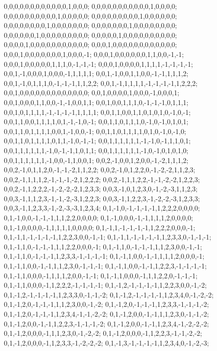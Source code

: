 {{0,0,0,0,0,0,0,0,0,0,0,0,1,0,0,0; 0,0,0,0,0,0,0,0,0,0,0,1,0,0,0,0; 0,0,0,0,0,0,0,0,0,0,1,0,0,0,0,0; 0,0,0,0,0,0,0,0,0,1,0,0,0,0,0,0; 0,0,0,0,0,0,0,0,1,0,0,0,0,0,0,0; 0,0,0,0,0,0,0,1,0,0,0,0,0,0,0,0; 0,0,0,0,0,0,1,0,0,0,0,0,0,0,0,0; 0,0,0,0,0,1,0,0,0,0,0,0,0,0,0,0; 0,0,0,0,1,0,0,0,0,0,0,0,0,0,0,0; 0,0,0,1,0,0,0,0,0,0,0,0,0,0,0,0; 0,0,0,1,0,0,0,0,0,0,0,1,0,0,0,-1; 0,0,0,1,0,0,0,0,0,0,1,1,0,0,-1,-1;
0,0,0,1,0,0,0,0,0,1,1,1,0,-1,-1,-1; 0,0,0,1,0,0,0,0,1,1,1,1,-1,-1,-1,-1; 0,0,1,-1,0,0,0,1,0,0,0,-1,1,1,1,1; 0,0,1,-1,0,0,1,1,0,0,-1,-1,1,1,1,2; 0,0,1,-1,0,1,1,1,0,-1,-1,-1,1,1,2,2; 0,0,1,-1,1,1,1,1,-1,-1,-1,-1,1,2,2,2; 0,0,1,0,0,0,0,0,0,0,0,0,0,0,0,0; 0,0,1,0,0,0,0,1,0,0,0,-1,0,0,0,1; 0,0,1,0,0,0,1,1,0,0,-1,-1,0,0,1,1; 0,0,1,0,0,1,1,1,0,-1,-1,-1,0,1,1,1; 0,0,1,0,1,1,1,1,-1,-1,-1,-1,1,1,1,1; 0,0,1,1,0,0,1,1,0,1,0,1,0,-1,0,-1;
0,0,1,1,0,0,1,1,1,1,0,1,-1,-1,0,-1; 0,0,1,1,0,1,1,1,0,-1,0,-1,0,1,0,1; 0,0,1,1,0,1,1,1,1,0,0,1,-1,0,0,-1; 0,0,1,1,0,1,1,1,1,0,1,0,-1,0,-1,0; 0,0,1,1,0,1,1,1,1,0,1,1,-1,0,-1,-1; 0,0,1,1,1,1,1,1,-1,-1,0,-1,1,1,0,1; 0,0,1,1,1,1,1,1,-1,0,-1,-1,1,0,1,1; 0,0,1,1,1,1,1,1,-1,0,-1,0,1,0,1,0; 0,0,1,1,1,1,1,1,-1,0,0,-1,1,0,0,1; 0,0,2,-1,0,0,1,2,0,0,-1,-2,1,1,1,2; 0,0,2,-1,0,1,1,2,0,-1,-1,-2,1,1,2,2; 0,0,2,-1,0,1,2,2,0,-1,-2,-2,1,1,2,3;
0,0,2,-1,1,1,1,2,-1,-1,-1,-2,1,2,2,2; 0,0,2,-1,1,1,2,2,-1,-1,-2,-2,1,2,2,3; 0,0,2,-1,1,2,2,2,-1,-2,-2,-2,1,2,3,3; 0,0,3,-1,0,1,2,3,0,-1,-2,-3,1,1,2,3; 0,0,3,-1,1,1,2,3,-1,-1,-2,-3,1,2,2,3; 0,0,3,-1,1,2,2,3,-1,-2,-2,-3,1,2,3,3; 0,0,3,-1,1,2,3,3,-1,-2,-3,-3,1,2,3,4; 0,1,-1,0,-1,-1,-1,-1,1,2,2,2,0,0,0,0; 0,1,-1,0,0,-1,-1,-1,1,1,2,2,0,0,0,0; 0,1,-1,0,0,0,-1,-1,1,1,1,2,0,0,0,0; 0,1,-1,0,0,0,0,-1,1,1,1,1,0,0,0,0; 0,1,-1,1,-1,-1,-1,-1,1,2,2,2,0,0,0,-1;
0,1,-1,1,-1,-1,-1,-1,1,2,2,3,0,0,-1,-1; 0,1,-1,1,-1,-1,-1,-1,1,2,3,3,0,-1,-1,-1; 0,1,-1,1,0,-1,-1,-1,1,1,2,2,0,0,0,-1; 0,1,-1,1,0,-1,-1,-1,1,1,2,3,0,0,-1,-1; 0,1,-1,1,0,-1,-1,-1,1,2,3,3,-1,-1,-1,-1; 0,1,-1,1,0,0,-1,-1,1,1,1,2,0,0,0,-1; 0,1,-1,1,0,0,-1,-1,1,1,2,3,0,-1,-1,-1; 0,1,-1,1,0,0,-1,-1,1,2,2,3,-1,-1,-1,-1; 0,1,-1,1,0,0,0,-1,1,1,1,2,0,0,-1,-1; 0,1,-1,1,0,0,0,-1,1,1,2,2,0,-1,-1,-1; 0,1,-1,1,0,0,0,-1,1,2,2,2,-1,-1,-1,-1; 0,1,-1,2,-1,-1,-1,-1,1,2,2,3,0,0,-1,-2;
0,1,-1,2,-1,-1,-1,-1,1,2,3,3,0,-1,-1,-2; 0,1,-1,2,-1,-1,-1,-1,1,2,3,4,0,-1,-2,-2; 0,1,-1,2,0,-1,-1,-1,1,1,2,3,0,0,-1,-2; 0,1,-1,2,0,-1,-1,-1,1,2,3,3,-1,-1,-1,-2; 0,1,-1,2,0,-1,-1,-1,1,2,3,4,-1,-1,-2,-2; 0,1,-1,2,0,0,-1,-1,1,1,2,3,0,-1,-1,-2; 0,1,-1,2,0,0,-1,-1,1,2,2,3,-1,-1,-1,-2; 0,1,-1,2,0,0,-1,-1,1,2,3,4,-1,-2,-2,-2; 0,1,-1,2,0,0,0,-1,1,1,2,3,0,-1,-2,-2; 0,1,-1,2,0,0,0,-1,1,2,2,3,-1,-1,-2,-2; 0,1,-1,2,0,0,0,-1,1,2,3,3,-1,-2,-2,-2; 0,1,-1,3,-1,-1,-1,-1,1,2,3,4,0,-1,-2,-3;
}}
